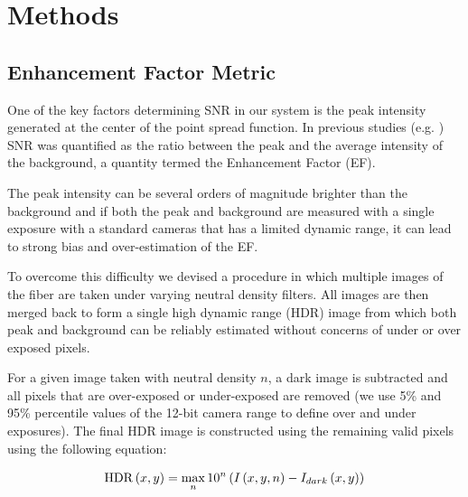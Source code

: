 \documentclass[10pt]{article}
\begin{document}
\section{Methods}
\subsection{Enhancement Factor Metric}\label{EnhancementFactor}
One of the key factors determining  SNR in our system is the peak intensity generated at the center of the point spread function. In previous studies (e.g. \cite{Conkey2012-qe}) SNR was quantified as the ratio between the peak and the average intensity of the background, a quantity termed the Enhancement Factor  (EF). 

The peak intensity can be several orders of magnitude brighter than the background and if both the peak and background are measured with a single exposure with a standard cameras that has a limited dynamic range, it can lead to strong bias and over-estimation of the EF.

To overcome this difficulty we devised a procedure in which multiple images of the fiber are taken under varying neutral density filters. All images are then merged back to form a single high dynamic range (HDR) image from which both peak and background can be reliably estimated without concerns of under or over exposed pixels. 

For a given image taken with neutral density $n$, a dark image is subtracted and all pixels that are over-exposed or under-exposed are
removed (we use 5\% and 95\% percentile values of the 12-bit camera range to define over and under exposures). The final HDR image is constructed using the remaining valid pixels using the following equation:

\[{\rm{HDR}}\left( {x,y} \right) = \mathop {\max }\limits_n {10^n}\left( {I\left( {x,y,n} \right) - {I_{dark}}\left( {x,y} \right)} \right)\]
\end{document}
